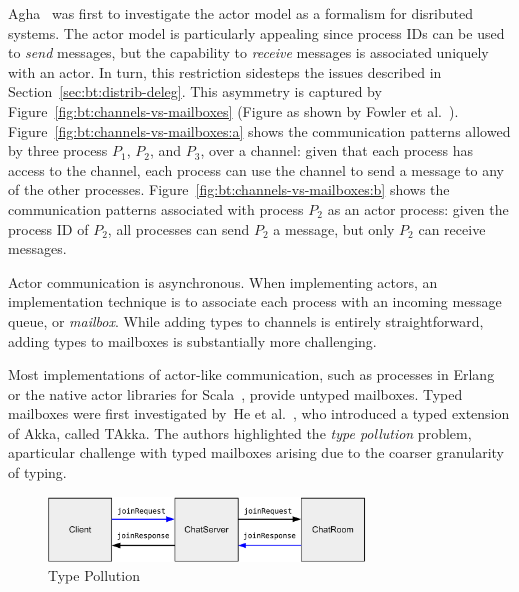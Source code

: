 \documentclass[
graybox,
envcountchap
]{svmult}
\begin{document}
\begin{bibunit}
  

  Agha~\cite{Agha90:actors} was first to investigate the actor model as a formalism
  for disributed systems. The actor model is particularly appealing since
  process IDs can be used to \emph{send} messages, but the capability to
  \emph{receive} messages is associated uniquely with an actor. In turn, this
  restriction sidesteps the issues described in
  Section~\ref{sec:bt:distrib-deleg}.
  This asymmetry is captured by Figure~\ref{fig:bt:channels-vs-mailboxes} (Figure
  as shown by Fowler et al.~\cite{FowlerLW17:mm}). Figure~\ref{fig:bt:channels-vs-mailboxes:a}
  shows the communication patterns allowed by three process $P_1$, $P_2$, and
  $P_3$, over a channel: given that each process has access to the channel,
  each process can use the channel to send a message to any of the other
  processes. Figure~\ref{fig:bt:channels-vs-mailboxes:b} shows the communication
  patterns associated with process $P_2$ as an actor process: given the process
  ID of $P_2$, all processes can send $P_2$ a message, but only $P_2$ can
  receive messages.

  Actor communication is asynchronous. When implementing actors, an
  implementation technique is to associate each process with an incoming message
  queue, or \emph{mailbox}. While adding types to channels is entirely
  straightforward, adding types to mailboxes is substantially more challenging.

  Most implementations of actor-like communication, such as processes in
  Erlang~\cite{Armstrong10:erlang} or the native actor libraries for
  Scala~\cite{HallerO09:actors}, provide untyped mailboxes.
  Typed mailboxes were first investigated by~He et al.~\cite{HeWT14:actors}, who
  introduced a typed extension of Akka, called TAkka. The authors highlighted
  the \emph{type pollution} problem, aparticular challenge with typed mailboxes
  arising due to the coarser granularity of typing.

  \begin{figure}[t]
    \centering
    \includegraphics[width=0.75\textwidth]{img/type-pollution-example.pdf}
    \caption{Type Pollution}
    \label{fig:bt:type-pollution}
  \end{figure}


\end{bibunit}
\end{document}
